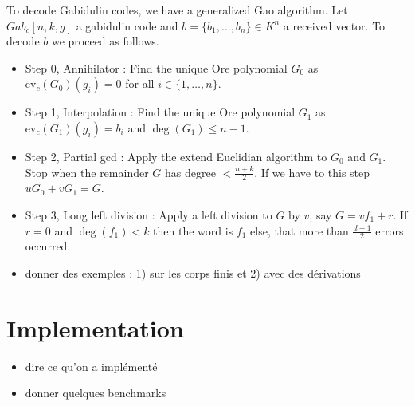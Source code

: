 \documentclass[a4paper]{llncs}
\def\todo#1{{\color{todo} #1}}
\newcommand{\ev}[1]{\textrm{ev}_{#1}}
\begin{document}
To decode Gabidulin codes, we have a generalized Gao algorithm. Let $Gab_c[n,k,g]$ a gabidulin code and $b = \{b_1, \dots, b_n\} \in K^n$ a received vector. To decode $b$ we proceed as follows.

\begin{itemize}
\item Step 0, Annihilator : Find the unique Ore polynomial $G_0$ as $\ev{c}(G_0)(g_i) = 0$ for all $i \in \{1, \dots, n\}$.
\item Step 1, Interpolation : Find the unique Ore polynomial $G_1$ as $\ev{c}(G_1)(g_i) = b_i$ and $\deg(G_1) \leqslant n-1$.
\item Step 2, Partial gcd : Apply the extend Euclidian algorithm to $G_0$ and $G_1$. Stop when the remainder $G$ has degree $< \frac{n+k}{2}$. If we have to this step $uG_0 + vG_1 = G$.
\item Step 3, Long left division : Apply a left division to $G$ by $v$, say $G = vf_1 + r$. If $r =0$ and $\deg(f_1) < k$ then the word is $f_1$ else, that more than $\frac{d-1}{2}$ errors occurred. 
\end{itemize}


\todo{\begin{itemize}
\item donner des exemples : 1) sur les corps finis et 2) avec des dérivations
\end{itemize}}

\section{Implementation}

\todo{\begin{itemize}
\item dire ce qu'on a implémenté
\item donner quelques benchmarks
\end{itemize}}
\end{document}
